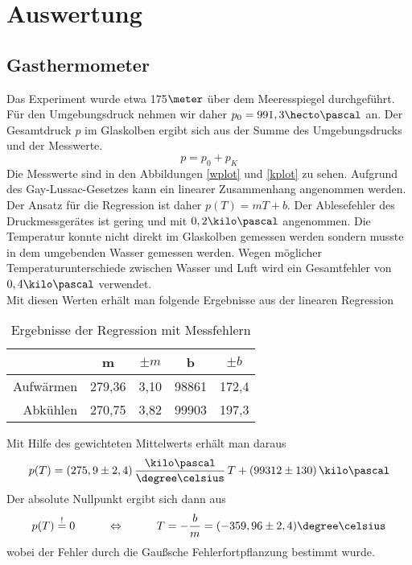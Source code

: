 \documentclass[12pt, a4paper, twoside]{scrartcl}
\begin{document}
\section{Auswertung}
\label{sec:auswertung}

\subsection{Gasthermometer}
Das Experiment wurde etwa 175$\meter$ über dem Meeresspiegel durchgeführt. Für den Umgebungsdruck nehmen wir daher $p_0=991,3\hecto\pascal$ an. Der Gesamtdruck $p$ im Glaskolben ergibt sich aus der Summe des Umgebungsdrucks und der Messwerte. $$p=p_0+p_K$$ Die Messwerte sind in den Abbildungen \ref{wplot} und \ref{kplot} zu sehen. Aufgrund des Gay-Lussac-Gesetzes kann ein linearer Zusammenhang angenommen werden. Der Ansatz für die Regression ist daher $p(T)=mT+b$. Der Ablesefehler des Druckmessgerätes ist gering und mit $0,2\kilo\pascal$ angenommen. Die Temperatur konnte nicht direkt im Glaskolben gemessen werden sondern musste in dem umgebenden Wasser gemessen werden. Wegen möglicher Temperaturunterschiede zwischen Wasser und Luft wird ein Gesamtfehler von $0,4\kilo\pascal$ verwendet.\\

Mit diesen Werten erhält man folgende Ergebnisse aus der linearen Regression

\begin{table} [h]
\centering
\begin{tabular}{r|c|c|c|c}
     & m & $\pm m$ & b & $\pm b$ \\
     \hline
    Aufwärmen &279,36 & 3,10 & 98861 & 172,4\\
     Abkühlen & 270,75 & 3,82& 99903& 197,3 \\
 \end{tabular} 
 \caption{\label{tab:}Ergebnisse der Regression mit Messfehlern}
\end{table}

Mit Hilfe des gewichteten Mittelwerts erhält man daraus
\begin{align*}
p(T)=\left(275,9\pm2,4\right)\frac{\kilo\pascal}{\degree\celsius}\,T+\left(99312\pm130\right)\kilo\pascal
\end{align*}
Der absolute Nullpunkt ergibt sich dann aus
\begin{align*}
p(T)\stackrel{!}{=}0\hspace{1.0cm}\Leftrightarrow\hspace*{1.0cm}T=-\frac{b}{m}=(-359,96\pm2,4)\degree\celsius
\end{align*}
wobei der Fehler durch die Gaußsche Fehlerfortpflanzung bestimmt wurde.
\end{document}
